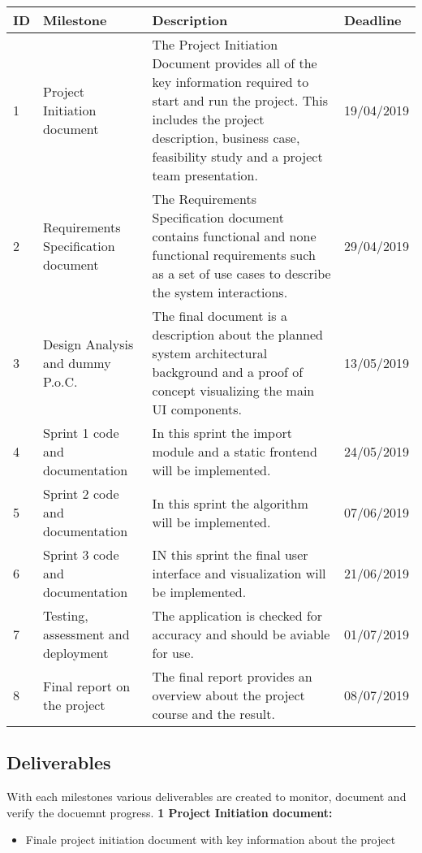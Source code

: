 \documentclass[notitlepage]{article}
\begin{document}
\begin{flushleft}
\begin{center}
  \begin{tabular}{ m{0.4cm} m{5cm} m{8.5cm} m{2cm} }
  	\hline
		ID & Milestone & Description & Deadline \\ \hline
		1 & Project Initiation document & The Project Initiation Document provides all of the key information required to start and run the project. This includes the project description, business case, feasibility study and a project team presentation.  & 19/04/2019 \\ \hline
		2 & Requirements Specification document & The Requirements Specification document contains functional and none functional requirements such as a set of use cases to describe the system interactions. & 29/04/2019 \\ \hline
		3 & Design Analysis and dummy P.o.C. & The final document is a description about the planned system architectural background and a proof of concept visualizing the main UI components. & 13/05/2019 \\ \hline
		4 & Sprint 1 code and documentation & In this sprint the import module and a static frontend will be implemented.  & 24/05/2019 \\ \hline
		5 & Sprint 2 code and documentation & In this sprint the algorithm will be implemented. & 07/06/2019 \\ \hline
		6 & Sprint 3 code and documentation & IN this sprint the final user interface and visualization will be implemented. & 21/06/2019 \\ \hline
		7 & Testing, assessment and deployment & The application is checked for accuracy and should be aviable for use. & 01/07/2019 \\ \hline
		8 & Final report on the project & The final report provides an overview about the project course and the result. & 08/07/2019 \\ \hline
	\end{tabular}
\end{center}

 

\subsection{Deliverables}
With each milestones various deliverables are created to monitor, document and verify the docuemnt progress.
\newline
\textbf{1 Project Initiation document:}
\\
\begin{itemize}
	\item Finale project initiation document with key information about the project
\end{itemize}


\end{flushleft}
\end{document}
